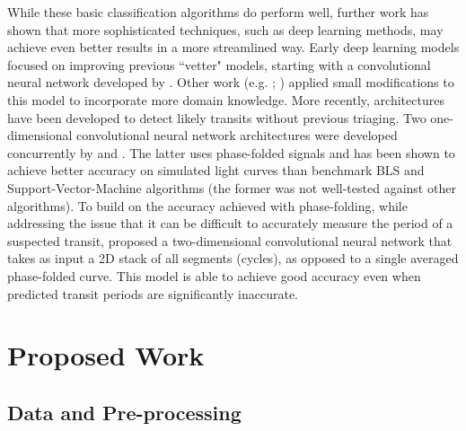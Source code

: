 \documentclass{article}
\begin{document}
While these basic classification algorithms do perform well, further work has shown that more sophisticated techniques, such as deep learning methods, may achieve even better results in a more streamlined way. Early deep learning models focused on improving previous ``vetter" models, starting with a convolutional neural network developed by \cite{Shallue_2018}. Other work (e.g. \citealp{Ansdell_2018};  \citealp{Yu_2019}) applied small modifications to this model to incorporate more domain knowledge.  More recently, architectures have been developed to detect likely transits without previous triaging. Two one-dimensional convolutional neural network architectures were developed concurrently by \cite{Zucker2018} and \cite{Pearson2018}. The latter uses phase-folded signals and has been shown to achieve better accuracy on simulated light curves than benchmark BLS and Support-Vector-Machine algorithms (the former was not well-tested against other algorithms). To build on the accuracy achieved with phase-folding, while addressing the issue that it can be difficult to accurately measure the period of a suspected transit,
\cite{Chintarungruangchai_2019} proposed a two-dimensional convolutional neural network that takes as input a 2D stack of all segments (cycles), as opposed to a single averaged phase-folded curve.  This model is able to achieve good accuracy even when predicted transit periods are significantly inaccurate. 


\section{Proposed Work}

\subsection{Data and Pre-processing}
\label{Data}
\end{document}

